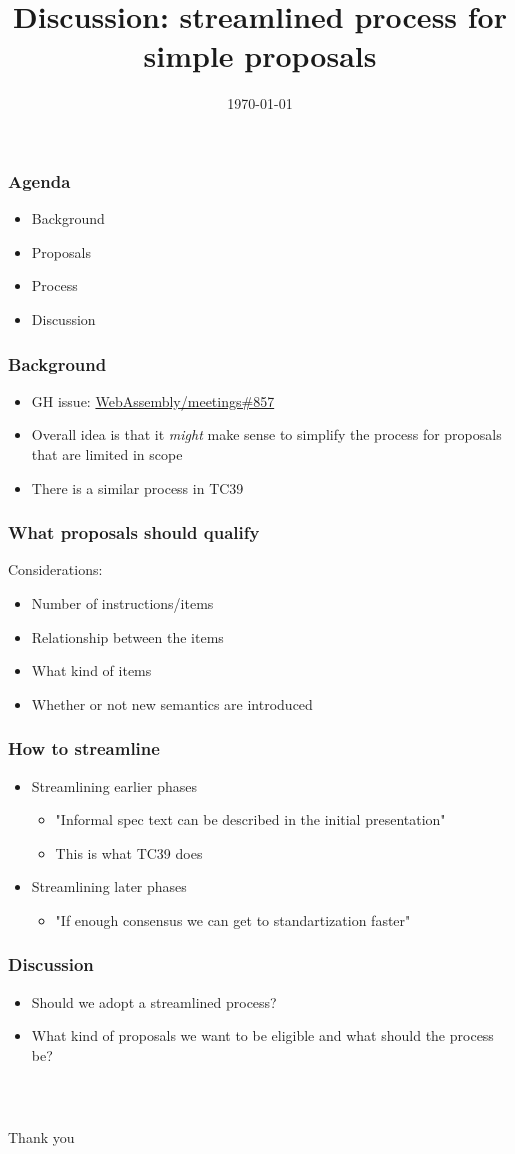 \documentclass[t,aspectratio=169, xcolor={table}]{beamer}
\title{Discussion: streamlined process for simple proposals}
\date{\today}
\begin{document}
\begin{frame}
  \titlepage
\end{frame}
\begin{frame}
\frametitle{Agenda}
  \begin{itemize}
  \item Background
  \item Proposals
  \item Process
  \item Discussion
  \end{itemize}
\end{frame}
\begin{frame}
\frametitle{Background}
  \begin{itemize}
  \item GH issue: \href{https://github.com/WebAssembly/meetings/issues/857}{WebAssembly/meetings\#857}
  \item Overall idea is that it \textit{might} make sense to simplify the process for proposals that are limited in scope
  \item There is a similar process in TC39
  \end{itemize}
\end{frame}
\begin{frame}
\frametitle{What proposals should qualify}
  Considerations:
  \begin{itemize}
  \item Number of instructions/items
  \item Relationship between the items
  \item What kind of items
  \item Whether or not new semantics are introduced
  \end{itemize}
\end{frame}
\begin{frame}
\frametitle{How to streamline}
  \begin{itemize}
  \item Streamlining earlier phases
    \begin{itemize}
    \item "Informal spec text can be described in the initial presentation"
    \item This is what TC39 does
    \end{itemize}
  \item Streamlining later phases
    \begin{itemize}
    \item "If enough consensus we can get to standartization faster"
    \end{itemize}
  \end{itemize}
\end{frame}
\begin{frame}
\frametitle{Discussion}
  \begin{itemize}
  \item Should we adopt a streamlined process?
  \item What kind of proposals we want to be eligible and what should the process be?
  \end{itemize}
\end{frame}
\begin{frame}
\frametitle{~}
\huge{Thank you}
\end{frame}
\end{document}
